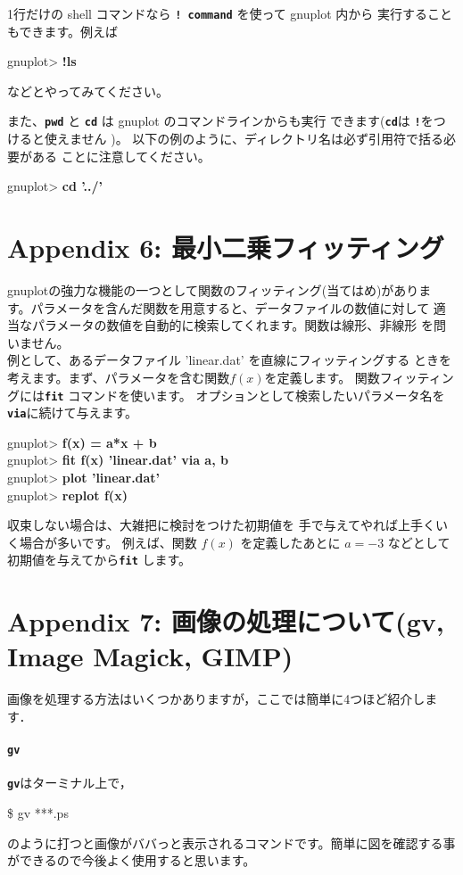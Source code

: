 \documentclass[a4j]{ujarticle} %
\newenvironment{terminal}{%
  \begin{center}
   \begin{minipage}{.8\textwidth}
    \setlength{\FrameSep}{.5\FrameSep}%
    \begin{framed}\ttfamily\small%
     \setlength\baselineskip{.85\baselineskip}%
}{%
    \end{framed}
   \end{minipage}
  \end{center}%
}
\begin{document}
1行だけの shell コマンドなら {\tt\bf ! command} を使って gnuplot 内から
実行することもできます。例えば
\begin{terminal}
 gnuplot> {\bf !ls}
\end{terminal}
などとやってみてください。

また、{\tt\bf pwd} と {\tt\bf cd} は gnuplot のコマンドラインからも実行
できます({\tt\bf cd}は {\tt\bf !}をつけると使えません )。
以下の例のように、ディレクトリ名は必ず引用符で括る必要がある
ことに注意してください。
\begin{terminal}
 gnuplot> {\bf cd '../'}
\end{terminal}

\section*{Appendix 6:  最小二乗フィッティング}
gnuplotの強力な機能の一つとして関数のフィッティング(当てはめ)がありま
す。パラメータを含んだ関数を用意すると、データファイルの数値に対して
適当なパラメータの数値を自動的に検索してくれます。関数は線形、非線形
を問いません。\\

例として、あるデータファイル 'linear.dat' を直線にフィッティングする
ときを考えます。まず、パラメータを含む関数$f(x)$を定義します。
関数フィッティングには{\tt\bf fit} コマンドを使います。
オプションとして検索したいパラメータ名を {\tt\bf via}に続けて与えます。

\begin{terminal}
 gnuplot> {\bf f(x) = a*x + b}\\
 gnuplot> {\bf fit f(x) 'linear.dat' via a, b}\\
 gnuplot> {\bf plot 'linear.dat'}\\
 gnuplot> {\bf replot f(x)}
\end{terminal}

収束しない場合は、大雑把に検討をつけた初期値を
手で与えてやれば上手くいく場合が多いです。
例えば、関数 $f(x)$ を定義したあとに
$a = -3$ などとして初期値を与えてから{\tt\bf fit} します。

\section*{Appendix 7:  画像の処理について(gv, Image Magick, GIMP)}
画像を処理する方法はいくつかありますが，ここでは簡単に4つほど紹介します．

\paragraph{{\tt\bf gv}}
{\tt\bf gv}はターミナル上で，
\begin{terminal}
\$ gv ***.ps
\end{terminal}
のように打つと画像がババっと表示されるコマンドです。簡単に図を確認する事ができるので今後よく使用すると思います。
\end{document}
